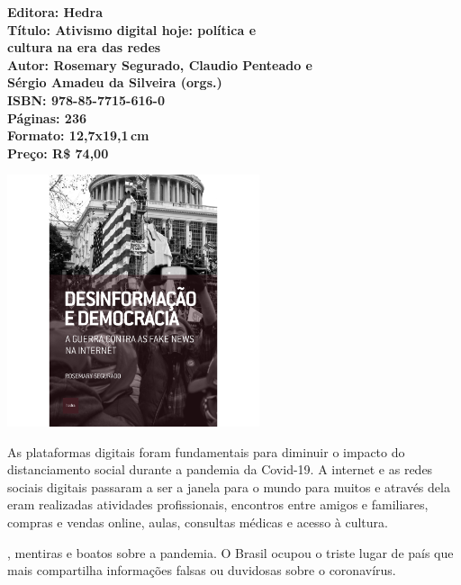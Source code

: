 \vfill
\noindent\begin{minipage}[c]{1\linewidth}
{\small\textbf{
\hspace*{-.1cm}Editora: Hedra\\
Título: Ativismo digital hoje: política e\\cultura na era das redes\\
Autor: Rosemary Segurado, Claudio Penteado e\\Sérgio Amadeu da Silveira (orgs.)\\ 
ISBN: 978-85-7715-616-0\\
Páginas: 236\\
Formato: 12,7x19,1\,cm\\
Preço: R\$ 74,00\\
}}
\end{minipage}
\pagebreak

\begin{center}
\hspace*{-3.6cm}
\hspace*{3.1cm}\includegraphics[width=74mm]{./CAPAS/HEDRA_DESINFORMACAO.jpg}
\end{center}
\hspace*{-7cm}\hrulefill\hspace*{-7cm}
\medskip

\noindent{}As plataformas digitais foram fundamentais para diminuir o impacto do distanciamento social durante a pandemia da Covid-19. A internet e as redes sociais digitais passaram a ser a janela para o mundo para muitos e através dela eram realizadas atividades profissionais, encontros entre amigos e familiares, compras e vendas online, aulas, consultas médicas e acesso à cultura. 

, mentiras e boatos sobre a pandemia. O Brasil ocupou o triste lugar de país que mais compartilha informações falsas ou duvidosas sobre o coronavírus.


